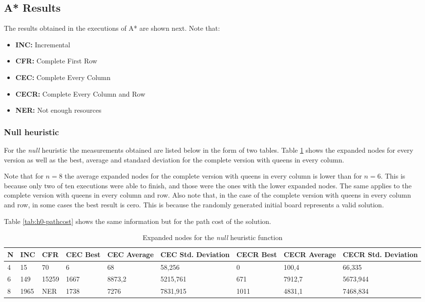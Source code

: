 \documentclass[]{llncs}
\begin{document}
\subsection{A* Results}\label{astar_results}
The results obtained in the executions of A* are shown next. Note that:

\begin{itemize}
    \item \textbf{INC:} Incremental
    \item \textbf{CFR:} Complete First Row
    \item \textbf{CEC:} Complete Every Column
    \item \textbf{CECR:} Complete Every Column and Row
    \item \textbf{NER:} Not enough resources
\end{itemize}
\subsubsection{Null heuristic}
For the \textit{null} heuristic the measurements obtained are listed below in the form of two tables. Table \ref{tab:h0-expanded} shows the expanded nodes for every version as well as the best, average and standard deviation for the complete version with queens in every column. 

Note that for $n = 8$ the average expanded nodes for the complete version with queens in every column is lower than for $n = 6$. This is because only two of ten executions were able to finish, and those were the ones with the lower expanded nodes. The same applies to the complete version with queens in every column and row. Also note that, in the case of the complete version with queens in every column and row, in some cases the best result is cero. This is because the randomly generated initial board represents a valid solution. 

Table \ref{tab:h0-pathcost} shows the same information but for the path cost of the solution.

\begin{table}[H]
    \caption{Expanded nodes for the \textit{null} heuristic function}
    \centering
    \resizebox{1 \textwidth}{!} { %
        \begin{tabular}{|l|l|l|l|l|l|l|l|l|}
            \hline
            N & INC & CFR & CEC Best & CEC Average & CEC Std. Deviation & CECR Best & CECR Average & CECR Std. Deviation \\ \hline
            4 & 15 & 70 & 6 & 68 & 58,256 & 0 & 100,4 & 66,335 \\
            6 & 149 & 15259 & 1667 & 8873,2 & 5215,761 & 671 & 7912,7 & 5673,944 \\
            8 & 1965 & NER & 1738 & 7276 & 7831,915 & 1011 & 4831,1 & 7468,834 \\ \hline
        \end{tabular}
        } %
        \label{tab:h0-expanded}
\end{table}
\end{document}
